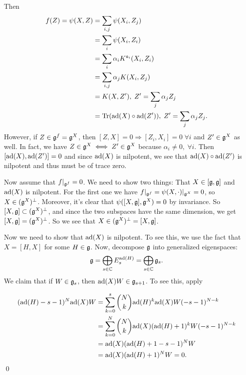 Then 
\begin{equation}
    \begin{split}
        f(Z)=\psi(X,Z)&=\sum_{i,j}\psi(X_i,Z_j)\\
        &=\sum_i\psi(X_i,Z_i)\\
        &=\sum_i\alpha_i K^{\mathfrak{s}_i}(X_i,Z_i)\\
        &=\sum_{i,j}\alpha_j K(X_i,Z_j)\\
        &=K(X,Z^\prime),\;Z^\prime = \sum_j\alpha_j Z_j\\
        &=\text{Tr}(\text{ad}(X)\circ\text{ad}(Z^\prime)),\;Z^\prime = \sum_j\alpha_j Z_j.
    \end{split}
\end{equation}
However, if $Z\in\mathfrak{g}^f=\mathfrak{g}^X$, then $[Z,X]=0\Rightarrow [Z_i,X_i]=0\;\forall i$ and $Z^\prime \in\mathfrak{g}^X$ as well. 
In fact, we have $Z\in\mathfrak{g}^X\iff Z^\prime \in\mathfrak{g}^X$ because $\alpha_i\neq0,\;\forall i$.
Then $[\text{ad}(X),\text{ad}(Z^\prime)]=0$ and since $\text{ad}(X)$ is nilpotent, we see that $\text{ad}(X)\circ\text{ad}(Z^\prime)$ is nilpotent and thus
must be of trace zero.\par


Now assume that $f|_{\mathfrak{g}^f}=0$. We need to show two things: That $X\in[\mathfrak{g},\mathfrak{g}]$ and $\text{ad}(X)$ is nilpotent. 
For the first one we have $f|_{\mathfrak{g}^f}=\psi(X,\cdot)|_{\mathfrak{g}^X}=0$, so $X\in(\mathfrak{g}^X)^\perp$. Moreover, it's clear that 
$\psi([X,\mathfrak{g}],\mathfrak{g}^X)=0$ by invariance. So $[X,\mathfrak{g}]\subset (\mathfrak{g}^X)^\perp$, and since the two subspaces have the same dimension, we get 
$[X,\mathfrak{g}]=(\mathfrak{g}^X)^\perp$. So we see that $X\in(\mathfrak{g}^X)^\perp=[X,\mathfrak{g}]$.\par 

Now we need to show that $\text{ad}(X)$ is nilpotent. To see this, we use the fact that $X=[H,X]$ for some $H\in\mathfrak{g}$. 
Now, decompose $\mathfrak{g}$ into generalized eigenspaces:
\begin{equation}
    \mathfrak{g}=\bigoplus_{s\in\mathbb{C}}E_s^{\text{ad}(H)}=\bigoplus_{s\in\mathbb{C}}\mathfrak{g}_s.
\end{equation}
We claim that if $W\in \mathfrak{g}_s$, then $\text{ad}(X)W\in \mathfrak{g}_{s+1}$. To see this, apply 

\begin{equation}
    \begin{split}
        (\text{ad}(H)-s-1)^N\text{ad}(X)W&=\sum_{k=0}^s\binom{N}{k}\text{ad}(H)^k\text{ad}(X)W(-s-1)^{N-k}\\
        &=\sum_{k=0}^N\binom{N}{k}\text{ad}(X)(\text{ad}(H)+1)^kW(-s-1)^{N-k}\\
        &=\text{ad}(X)(\text{ad}(H)+1-s-1)^NW\\
        &=\text{ad}(X)(\text{ad}(H)+1)^NW=0.
    \end{split}
\end{equation}
\qed

